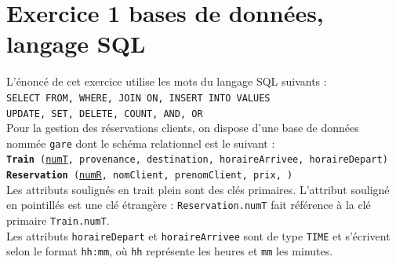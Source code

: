 \documentclass[a4paper,12pt,eval,firamath]{nsi}
\begin{document}
\maketitle


\section*{Exercice 1 \small{\hfill bases de données, langage SQL}}

L'énoncé de cet exercice utilise les mots du langage SQL suivants :\\

 \texttt{SELECT FROM, WHERE, JOIN ON, INSERT INTO VALUES}\\
 \texttt{UPDATE, SET, DELETE, COUNT, AND, OR}\\

Pour la gestion des réservations clients, on dispose d'une base de données nommée \texttt{gare} dont le schéma relationnel est le suivant :\\

\texttt{\textbf{Train} (\uline{numT}, provenance, destination, horaireArrivee, horaireDepart)}\\

\texttt{\textbf{Reservation} (\uline{numR}, nomClient, prenomClient, prix, )}\\

Les attributs soulignés en trait plein sont des clés primaires. L'attribut souligné en pointillés est une clé étrangère : \texttt{Reservation.numT} fait référence à la clé primaire \texttt{Train.numT}.\\

Les attributs \texttt{horaireDepart} et \texttt{horaireArrivee} sont de type  \texttt{TIME} et s'écrivent selon le format \texttt{hh:mm}, où \texttt{hh} représente les heures et \texttt{mm} les minutes.\\
\end{document}
